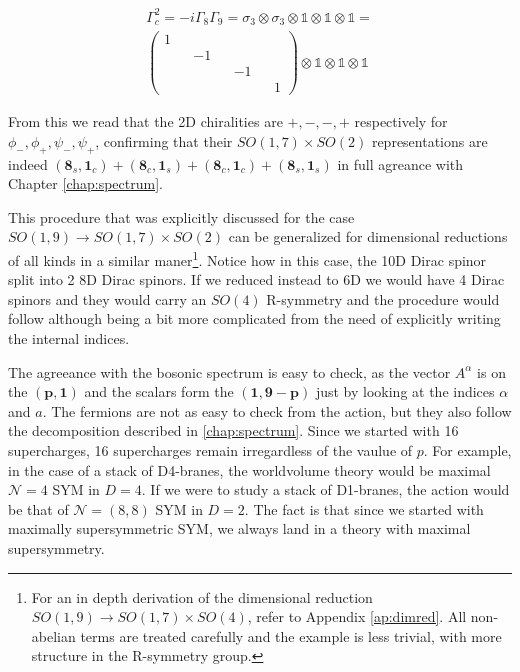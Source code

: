 \begin{equation}
    \begin{aligned}
        \Gamma^2_c = -i \Gamma_8 \Gamma_9 = \sigma_3 \otimes \sigma_3 \otimes \mathbb{1}\otimes \mathbb{1}\otimes \mathbb{1} = \\ \begin{pmatrix}
            1 && && && \\
              && -1 && && \\
             && && -1 && \\
             && && && 1
        \end{pmatrix} \otimes \mathbb{1}\otimes \mathbb{1}\otimes \mathbb{1}
    \end{aligned}
\end{equation}

From this we read that the 2D chiralities are $+,-,-,+$ respectively for $\phi_-, \phi_+, \psi_-,\psi_+$, confirming that their $SO(1,7)\times SO(2)$ representations are indeed $(\mathbf{8}_s,\mathbf{1}_c)+(\mathbf{8}_c,\mathbf{1}_s)+(\mathbf{8}_c,\mathbf{1}_c)+(\mathbf{8}_s,\mathbf{1}_s)$ in full agreance with Chapter \ref{chap:spectrum}.

This procedure that was explicitly discussed for the case $SO(1,9) \rightarrow SO(1,7) \times SO(2)$ can be generalized for dimensional reductions of all kinds in a similar maner\footnote{For an in depth derivation of the dimensional reduction $SO(1,9) \rightarrow SO(1,7)\times SO(4)$, refer to Appendix \ref{ap:dimred}. All non-abelian terms are treated carefully and the example is less trivial, with more structure in the R-symmetry group.}. Notice how in this case, the 10D Dirac spinor split into 2 8D Dirac spinors. If we reduced instead to 6D we would have 4 Dirac spinors and they would carry an $SO(4)$ R-symmetry and the procedure would follow although being a bit more complicated from the need of explicitly writing the internal indices.

The agreeance with the bosonic spectrum is easy to check, as the vector $A^\alpha$ is on the $(\mathbf{p}, \mathbf{1})$ and the scalars form the $(\mathbf{1}, \mathbf{9-p})$ just by looking at the indices $\alpha$ and $a$. The fermions are not as easy to check from the action, but they also follow the decomposition described in \ref{chap:spectrum}. Since we started with 16 supercharges, 16 supercharges remain irregardless of the vaulue of $p$. For example, in the case of a stack of D4-branes, the worldvolume theory would be maximal $\mathcal{N} = 4$ SYM in $D = 4$. If we were to study a stack of D1-branes, the action would be that of $\mathcal{N} = (8,8)$ SYM in $D = 2$. The fact is that since we started with maximally supersymmetric SYM, we always land in a theory with maximal supersymmetry.

